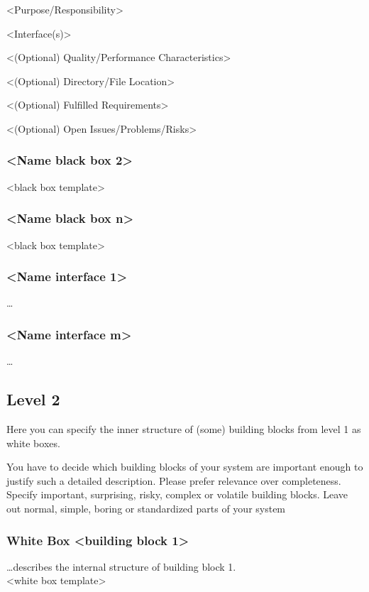 \documentclass[12pt,a4paper]{article}
\begin{document}
\textless Purpose/Responsibility\textgreater

\textless Interface(s)\textgreater

\textless (Optional) Quality/Performance Characteristics\textgreater

\textless (Optional) Directory/File Location\textgreater

\textless (Optional) Fulfilled Requirements\textgreater

\textless (Optional) Open Issues/Problems/Risks\textgreater

\subsubsection{\textless Name black box 2\textgreater}
\textless black box template\textgreater

\subsubsection{\textless Name black box n\textgreater}
\textless black box template\textgreater

\subsubsection{\textless Name interface 1\textgreater}
\dots

\subsubsection{\textless Name interface m\textgreater}
\dots

\subsection{Level 2}

Here you can specify the inner structure of (some) building blocks from level 1 as white boxes.

You have to decide which building blocks of your system are important enough to justify such a detailed description. Please prefer relevance over completeness. Specify important, surprising, risky, complex or volatile building blocks. Leave out normal, simple, boring or standardized parts of your system

\subsubsection{White Box \textless building block 1\textgreater}
\dots describes the internal structure of building block 1.\\
\textless white box template\textgreater
\end{document}
